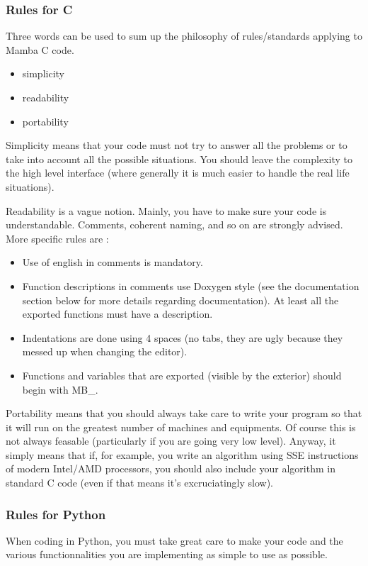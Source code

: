 \documentclass[a4paper,10pt,oneside]{article}
\begin{document}
\subsubsection{Rules for C}

Three words can be used to sum up the philosophy of rules/standards
applying to Mamba C code.
\begin{itemize}
\item simplicity 
\item readability 
\item portability 
\end{itemize}
Simplicity means that your code must not try to answer all the problems
or to take into account all the possible situations. You should leave
the complexity to the high level interface (where generally it is
much easier to handle the real life situations).

Readability is a vague notion. Mainly, you have to make sure your
code is understandable. Comments, coherent naming, and so on are strongly
advised. More specific rules are :
\begin{itemize}
\item Use of english in comments is mandatory.
\item Function descriptions in comments use Doxygen style (see the documentation
section below for more details regarding documentation). At least all the 
exported functions must have a description.
\item Indentations are done using 4 spaces (no tabs, they are ugly because
they messed up when changing the editor). 
\item Functions and variables that are exported (visible by the exterior)
should begin with \textquotedbl{}MB\_\textquotedbl{}. 
\end{itemize}
Portability means that you should always take care to write your program
so that it will run on the greatest number of machines and equipments.
Of course this is not always feasable (particularly if you are going
very low level). Anyway, it simply means that if, for example, you
write an algorithm using SSE instructions of modern Intel/AMD processors,
you should also include your algorithm in standard C code (even if
that means it's excruciatingly slow).

\subsubsection{Rules for Python}

When coding in Python, you must take great care to make your code and the
various functionnalities you are implementing as simple to use as possible.
\end{document}
